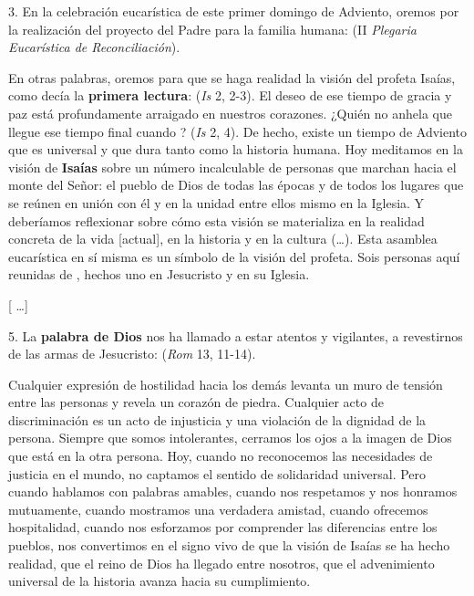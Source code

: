 \begin{body}
	3. En la celebración eucarística de este primer domingo de Adviento, oremos por la realización del proyecto del Padre para la familia humana:  (II \emph{Plegaria Eucarística de Reconciliación}).

	En otras palabras, oremos para que se haga realidad la visión del profeta Isaías, como decía la \textbf{primera lectura}:  (\emph{Is} 2, 2-3). El deseo de ese tiempo de gracia y paz está profundamente arraigado en nuestros corazones. ¿Quién no anhela que llegue ese tiempo final cuando ? (\emph{Is} 2, 4). De hecho, existe un tiempo de Adviento que es universal y que dura tanto como la historia humana. Hoy meditamos en la visión de \textbf{Isaías} sobre un número incalculable de personas que marchan hacia el monte del Señor: el pueblo de Dios de todas las épocas y de todos los lugares que se reúnen en unión con él y en la unidad entre ellos mismo en la Iglesia. Y deberíamos reflexionar sobre cómo esta visión se materializa en la realidad concreta de la vida {[}actual{]}, en la historia y en la cultura (\ldots{}). Esta asamblea eucarística en sí misma es un símbolo de la visión del profeta. Sois personas aquí reunidas de , hechos uno en Jesucristo y en su Iglesia.

	{[} \ldots{}{]}

	5. La \textbf{palabra de Dios} nos ha llamado a estar atentos y vigilantes, a revestirnos de las armas de Jesucristo:  (\emph{Rom} 13, 11-14).

	Cualquier expresión de hostilidad hacia los demás levanta un muro de tensión entre las personas y revela un corazón de piedra. Cualquier acto de discriminación es un acto de injusticia y una violación de la dignidad de la persona. Siempre que somos intolerantes, cerramos los ojos a la imagen de Dios que está en la otra persona. Hoy, cuando no reconocemos las necesidades de justicia en el mundo, no captamos el sentido de solidaridad universal. Pero cuando hablamos con palabras amables, cuando nos respetamos y nos honramos mutuamente, cuando mostramos una verdadera amistad, cuando ofrecemos hospitalidad, cuando nos esforzamos por comprender las diferencias entre los pueblos, nos convertimos en el signo vivo de que la visión de Isaías se ha hecho realidad, que el reino de Dios ha llegado entre nosotros, que el advenimiento universal de la historia avanza hacia su cumplimiento.


\end{body}
